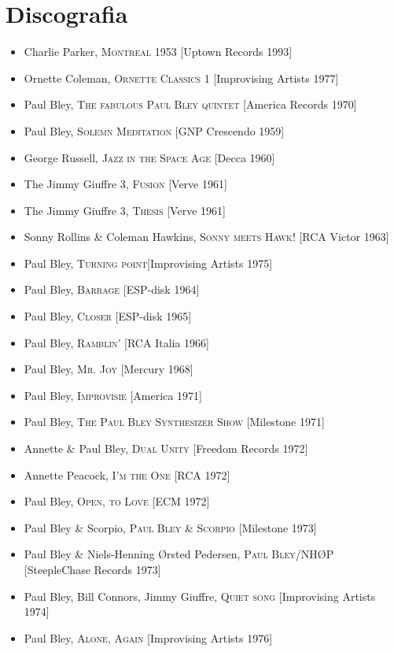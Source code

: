 \chapter{Discografia}
\begin{itemize}
	\item Charlie Parker, \textsc{Montreal 1953} [Uptown Records 1993]
	\item Ornette Coleman, \textsc{Ornette Classics 1} [Improvising Artists 1977]
	\item Paul Bley, \textsc{The fabulous Paul Bley quintet} [America Records 1970]
	\item Paul Bley, \textsc{Solemn Meditation} [GNP Crescendo 1959]
	\item George Russell, \textsc{Jazz in the Space Age} [Decca 1960]
	\item The Jimmy Giuffre 3, \textsc{Fusion} [Verve 1961]
	\item The Jimmy Giuffre 3, \textsc{Thesis} [Verve 1961]
	\item Sonny Rollins \& Coleman Hawkins, \textsc{Sonny meets Hawk!} [RCA Victor 1963]
	\item Paul Bley, \textsc{Turning point}[Improvising Artists 1975]
	\item Paul Bley, \textsc{Barrage} [ESP-disk 1964] 
	\item Paul Bley, \textsc{Closer} [ESP-disk 1965] 
	\item Paul Bley, \textsc{Ramblin'} [RCA Italia 1966]
	\item Paul Bley, \textsc{Mr. Joy} [Mercury 1968]
	\item Paul Bley, \textsc{Improvisie} [America 1971]
	\item Paul Bley, \textsc{The Paul Bley Synthesizer Show} [Milestone 1971]
	\item Annette \& Paul Bley, \textsc{Dual Unity} [Freedom Records 1972]
	\item Annette Peacock, \textsc{I'm the One} [RCA 1972]
	\item Paul Bley, \textsc{Open, to Love} [ECM 1972]
	\item Paul Bley \& Scorpio, \textsc{Paul Bley \& Scorpio} [Milestone 1973]
	\item Paul Bley \& Niels-Henning Ørsted Pedersen, \textsc{Paul Bley/NHØP} [SteepleChase Records 1973]
	\item Paul Bley, Bill Connors, Jimmy Giuffre, \textsc{Quiet song} [Improvising Artists 1974]
	\item Paul Bley, \textsc{Alone, Again} [Improvising Artists 1976]

\end{itemize}
